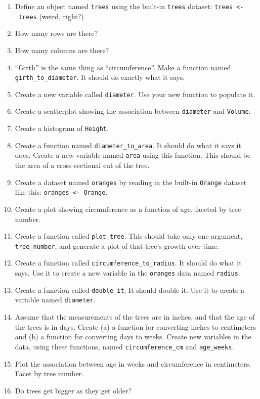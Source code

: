 \documentclass[
]{book}
\begin{document}
\begin{enumerate}
\def\labelenumi{\arabic{enumi}.}
\item
  Define an object named \texttt{trees} using the built-in \texttt{trees} dataset: \texttt{trees\ \textless{}-\ trees} (weird, right?)
\item
  How many rows are there?
\item
  How many columns are there?
\item
  ``Girth'' is the same thing as ``circumference''. Make a function named \texttt{girth\_to\_diameter}. It should do exactly what it says.
\item
  Create a new variable called \texttt{diameter}. Use your new function to populate it.
\item
  Create a scatterplot showing the association between \texttt{diameter} and \texttt{Volume}.
\item
  Create a histogram of \texttt{Height}.
\item
  Create a function named \texttt{diameter\_to\_area}. It should do what it says it does. Create a new variable named \texttt{area} using this function. This should be the area of a cross-sectional cut of the tree.
\item
  Create a dataset named \texttt{oranges} by reading in the built-in \texttt{Orange} dataset like this: \texttt{oranges\ \textless{}-\ Orange}.
\item
  Create a plot showing circumference as a function of age, faceted by tree number.
\item
  Create a function called \texttt{plot\_tree}. This should take only one argument, \texttt{tree\_number}, and generate a plot of that tree's growth over time.
\item
  Create a function called \texttt{circumference\_to\_radius}. It should do what it says. Use it to create a new variable in the \texttt{oranges} data named \texttt{radius}.
\item
  Create a function called \texttt{double\_it}. It should double it. Use it to create a variable named \texttt{diameter}.
\item
  Assume that the measurements of the trees are in inches, and that the age of the trees is in days. Create (a) a function for converting inches to centimeters and (b) a function for converting days to weeks. Create new variables in the data, using these functions, named \texttt{circumference\_cm} and \texttt{age\_weeks}.
\item
  Plot the association between age in weeks and circumference in centimeters. Facet by tree number.
\item
  Do trees get bigger as they get older?
\end{enumerate}
\end{document}
